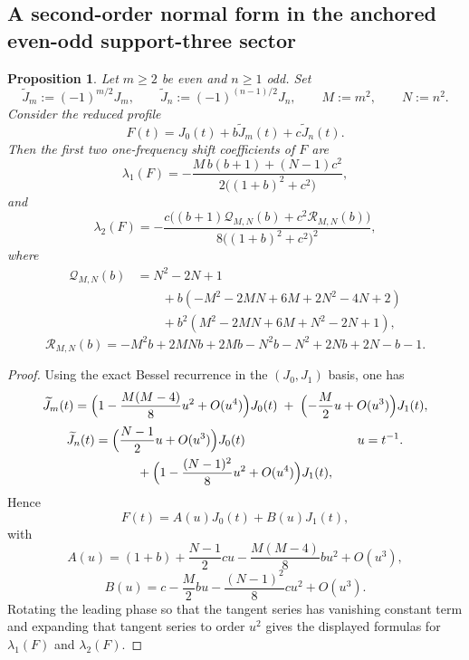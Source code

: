 \documentclass[11pt,reqno]{amsart}
\newtheorem{proposition}[theorem]{Proposition}
\theoremstyle{definition}
\begin{document}
\subsection*{A second-order normal form in the anchored even-odd support-three sector}

\begin{proposition}\label{prop:anchor-evenodd-second-order}
Let $m\ge 2$ be even and $n\ge 1$ odd. Set
\[
\widetilde J_m:=(-1)^{m/2}J_m,
\qquad
\widetilde J_n:=(-1)^{(n-1)/2}J_n,
\qquad
M:=m^2,
\qquad
N:=n^2.
\]
Consider the reduced profile
\[
F(t)=J_0(t)+b\widetilde J_m(t)+c\widetilde J_n(t).
\]
Then the first two one-frequency shift coefficients of $F$ are
\[
\lambda_1(F)
=
-\frac{M\,b(b+1)+(N-1)c^2}{2\bigl((1+b)^2+c^2\bigr)},
\]
and
\[
\lambda_2(F)
=
-\frac{c\bigl((b+1)\mathcal Q_{M,N}(b)+c^2\mathcal R_{M,N}(b)\bigr)}
{8\bigl((1+b)^2+c^2\bigr)^2},
\]
where
\[
\begin{aligned}
\mathcal Q_{M,N}(b)
&=
N^2-2N+1\\
&\qquad
+b(-M^2-2MN+6M+2N^2-4N+2)\\
&\qquad
+b^2(M^2-2MN+6M+N^2-2N+1),
\end{aligned}
\]
\[
\mathcal R_{M,N}(b)
=
-M^2b+2MNb+2Mb-N^2b-N^2+2Nb+2N-b-1.
\]
\end{proposition}

\begin{proof}
Using the exact Bessel recurrence in the $(J_0,J_1)$ basis, one has
\[
\widetilde J_m(t)
=
\Bigl(1-\frac{M(M-4)}{8}u^2+O(u^4)\Bigr)J_0(t)
\;+\;
\Bigl(-\frac{M}{2}u+O(u^3)\Bigr)J_1(t),
\]
\[
\widetilde J_n(t)
=
\begin{aligned}[t]
&\Bigl(\frac{N-1}{2}u+O(u^3)\Bigr)J_0(t)\\
&\qquad +\Bigl(1-\frac{(N-1)^2}{8}u^2+O(u^4)\Bigr)J_1(t),
\end{aligned}
\qquad
u=t^{-1}.
\]
Hence
\[
F(t)=A(u)J_0(t)+B(u)J_1(t),
\]
with
\[
A(u)
=
(1+b)+\frac{N-1}{2}cu-\frac{M(M-4)}{8}bu^2+O(u^3),
\]
\[
B(u)
=
c-\frac{M}{2}bu-\frac{(N-1)^2}{8}cu^2+O(u^3).
\]
Rotating the leading phase so that the tangent series has vanishing constant term and expanding
that tangent series to order $u^2$ gives the displayed formulas for $\lambda_1(F)$ and
$\lambda_2(F)$.
\end{proof}
\end{document}
